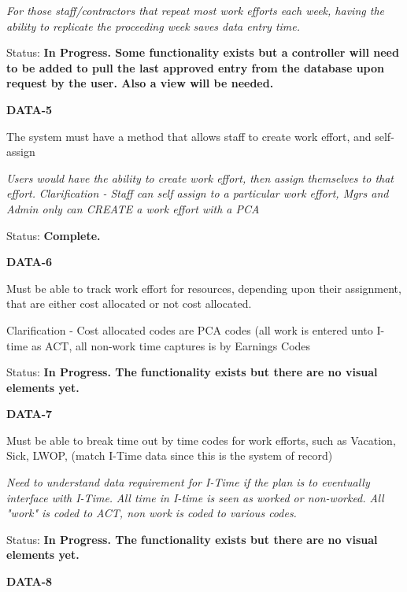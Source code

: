 \documentclass{article}
\begin{document}
\noindent \textit{For those staff/contractors that repeat most work efforts each week, having the ability to replicate the proceeding week saves data entry time.}

\noindent Status: \textbf{In Progress.  Some functionality exists but a controller will need to be added to pull the last approved entry from the database upon request by the user.  Also a view will be needed.}\textit{}

\noindent \textit{}


\noindent \textbf{DATA-5}

\noindent The system must have a method that allows staff to create work effort, and self-assign

\noindent \textit{Users would have the ability to create work effort, then assign themselves to that effort.} \textit{Clarification - Staff can self assign to a particular work effort, Mgrs and Admin only can CREATE a work effort with a PCA}

Status: \textbf{Complete.}\textit{}

\noindent \textit{}


\noindent \textbf{DATA-6}

\noindent Must be able to track work effort for resources, depending upon their assignment, that are either cost allocated or not cost allocated. 

\noindent Clarification - Cost allocated codes are PCA codes (all work is entered unto I-time as ACT, all non-work time captures is by Earnings Codes\textit{}

Status: \textbf{In Progress.  The functionality exists but there are no visual elements yet.}\textit{}

\noindent \textit{}


\noindent \textbf{DATA-7}

\noindent Must be able to break time out by time codes for work efforts, such as Vacation, Sick, LWOP, (match I-Time data since this is the system of record)

\noindent \textit{Need to understand data requirement for I-Time if the plan is to eventually interface with I-Time.} \textit{All time in I-time is seen as worked or non-worked.  All "work" is coded to ACT, non work is coded to various codes.}

\textit{ }Status: \textbf{In Progress.  The functionality exists but there are no visual elements yet.}

\noindent \textit{}


\noindent \textbf{DATA-8}
\end{document}
